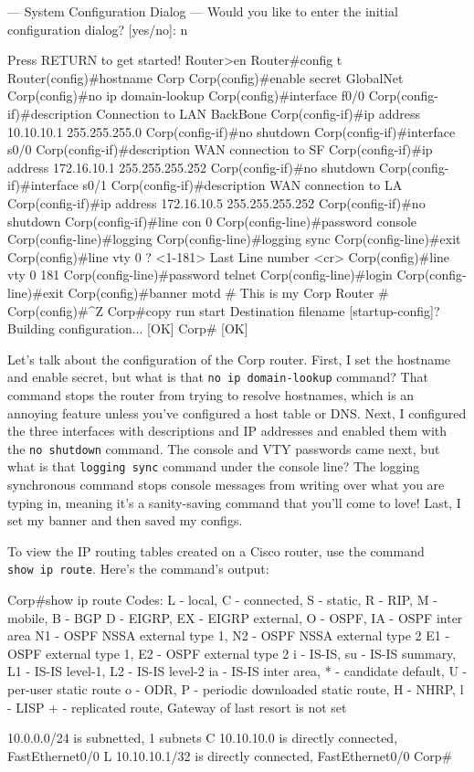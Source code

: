 \begin{cli}
         --- System Configuration Dialog ---
Would you like to enter the initial configuration dialog? [yes/no]: n
 
Press RETURN to get started!
Router>en
Router#config t
Router(config)#hostname Corp
Corp(config)#enable secret GlobalNet
Corp(config)#no ip domain-lookup
Corp(config)#interface f0/0
Corp(config-if)#description Connection to LAN BackBone
Corp(config-if)#ip address 10.10.10.1 255.255.255.0
Corp(config-if)#no shutdown
Corp(config-if)#interface s0/0
Corp(config-if)#description WAN connection to SF
Corp(config-if)#ip address 172.16.10.1 255.255.255.252
Corp(config-if)#no shutdown
Corp(config-if)#interface s0/1
Corp(config-if)#description WAN connection to LA
Corp(config-if)#ip address 172.16.10.5 255.255.255.252
Corp(config-if)#no shutdown
Corp(config-if)#line con 0
Corp(config-line)#password console
Corp(config-line)#logging
Corp(config-line)#logging sync
Corp(config-line)#exit
Corp(config)#line vty 0 ?
  <1-181>  Last Line number
  <cr>
Corp(config)#line vty 0 181
Corp(config-line)#password telnet
Corp(config-line)#login
Corp(config-line)#exit
Corp(config)#banner motd # This is my Corp Router #
Corp(config)#^Z
Corp#copy run start
Destination filename [startup-config]?
Building configuration...
[OK]
Corp# [OK]
\end{cli}

Let's talk about the configuration of the Corp router. First, I set the
hostname and enable secret, but what is that
\texttt{no\ ip\ domain-lookup} command? That command stops the router
from trying to resolve hostnames, which is an annoying feature unless
you've configured a host table or DNS. Next, I configured the three
interfaces with descriptions and IP addresses and enabled them with the
\texttt{no\ shutdown} command. The console and VTY passwords came next,
but what is that \texttt{logging\ sync} command under the console line?
The logging synchronous command stops console messages from writing over
what you are typing in, meaning it's a sanity-saving command that you'll
come to love! Last, I set my banner and then saved my configs.

To view the IP routing tables created on a Cisco router, use the command \texttt{show\ ip\ route}.
Here's the command's output:

\begin{cli}
Corp#show ip route
Codes: L - local, C - connected, S - static, R - RIP, M - mobile, B - BGP
   D - EIGRP, EX - EIGRP external, O - OSPF, IA - OSPF inter area
   N1 - OSPF NSSA external type 1, N2 - OSPF NSSA external type 2
   E1 - OSPF external type 1, E2 - OSPF external type 2
   i - IS-IS, su - IS-IS summary, L1 - IS-IS level-1, L2 - IS-IS level-2
   ia - IS-IS inter area, * - candidate default, U - per-user static route
   o - ODR, P - periodic downloaded static route, H - NHRP, l - LISP
   + - replicated route, %
Gateway of last resort is not set
 
     10.0.0.0/24 is subnetted, 1 subnets
C       10.10.10.0 is directly connected, FastEthernet0/0
L       10.10.10.1/32 is directly connected, FastEthernet0/0
Corp#
\end{cli}

